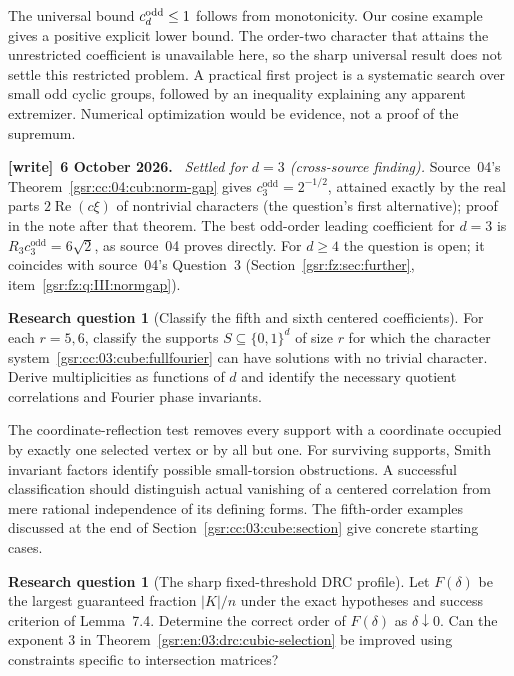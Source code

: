 \documentclass[11pt,letterpaper]{article}
\numberwithin{equation}{section}
\theoremstyle{definition}
\newtheorem{problem}[theorem]{Research question}
\theoremstyle{remark}
\newcommand{\1}{\mathbf 1}
\newenvironment{writenote}[1][]{\par\smallskip\begingroup\small
 \noindent\textbf{[write]}\if\relax\detokenize{#1}\relax\else~\textbf{#1.}\fi\ }%
 {\par\endgroup\smallskip}
\begin{document}
The universal bound $c_d^{\rm odd}\le1$ follows from monotonicity.
Our cosine example gives a positive explicit lower bound. The order-two
character that attains the unrestricted coefficient is unavailable here,
so the sharp universal result does not settle this restricted problem.
A practical first project is a systematic search over small odd cyclic
groups, followed by an inequality explaining any apparent extremizer.
Numerical optimization would be evidence, not a proof of the supremum.
\begin{writenote}[6 October 2026]
\emph{Settled for $d=3$ (cross-source finding).} Source~04's Theorem~\ref{gsr:cc:04:cub:norm-gap} gives $c_3^{\mathrm{odd}}=2^{-1/2}$, attained exactly by the real parts $2\operatorname{Re}(c\xi)$ of nontrivial characters (the question's first alternative); proof in the note after that theorem. The best odd-order leading coefficient for $d=3$ is $R_3c_3^{\mathrm{odd}}=6\sqrt2$, as source~04 proves directly. For $d\ge4$ the question is open; it coincides with source~04's Question~3 (Section~\ref{gsr:fz:sec:further}, item~\ref{gsr:fz:q:III:normgap}).
\end{writenote}

\begin{problem}[Classify the fifth and sixth centered coefficients]
For each $r=5,6$, classify the supports $S\subseteq\{0,1\}^d$ of size
$r$ for which the character system~\eqref{gsr:cc:03:cube:fullfourier} can have
solutions with no trivial character. Derive multiplicities as functions
of $d$ and identify the necessary quotient correlations and Fourier phase
invariants.
\end{problem}

The coordinate-reflection test removes every support with a coordinate
occupied by exactly one selected vertex or by all but one. For surviving
supports, Smith invariant factors identify possible small-torsion
obstructions. A successful classification should distinguish actual
vanishing of a centered correlation from mere rational independence of
its defining forms. The fifth-order examples discussed at the end of
Section~\ref{gsr:cc:03:cube:section} give concrete starting cases.

\begin{problem}[The sharp fixed-threshold DRC profile]
Let $F(\delta)$ be the largest guaranteed fraction $|K|/n$ under the
exact hypotheses and success criterion of Lemma~7.4. Determine the
correct order of $F(\delta)$ as $\delta\downarrow0$. Can the exponent
$3$ in Theorem~\ref{gsr:en:03:drc:cubic-selection} be improved using constraints
specific to intersection matrices?
\end{problem}
\end{document}
